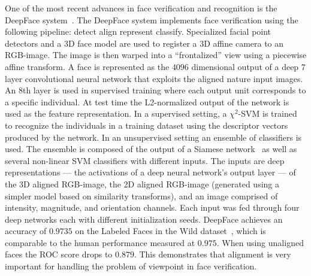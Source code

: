         One of the most recent advances in face verification and recognition is the DeepFace
        system~\cite{taigman_deepface_2014}. The DeepFace system implements face verification using the following
        pipeline: detect \rpipe{} align \rpipe{} represent \rpipe{} classify. Specialized facial point detectors
        and a 3D face model are used to register a 3D affine camera to an RGB-image. The image is then warped into
        a ``frontalized'' view using a piecewise affine transform. A face is represented as the $4096$ dimensional
        output of a deep $7$ layer convolutional neural network that exploits the aligned nature input images. An
        8th layer is used in supervised training where each output unit corresponds to a specific individual.
        At test time the L2-normalized output of the network is used as the feature representation. In a supervised
        setting, a $\chi^2$-SVM is trained to recognize the individuals in a training dataset using the descriptor
        vectors produced by the network. In an unsupervised setting an ensemble of classifiers is used. The
        ensemble is composed of the output of a Siamese network~\cite{chopra_learning_2005} as well as several
        non-linear SVM classifiers with different inputs. The inputs are deep representations --- the activations
        of a deep neural network's output layer --- of the 3D aligned RGB-image, the 2D aligned RGB-image
        (generated using a simpler model based on similarity transforms), and an image comprised of intensity,
        magnitude, and orientation channels. Each input was fed through four deep networks each with different
        initialization seeds.
        DeepFace achieves an accuracy of $0.9735$ on the Labeled Faces in the Wild
        dataset~\cite{huang_labeled_2007}, which is comparable to the human performance measured at $0.975$. When
        using unaligned faces the ROC score drops to $0.879$. This demonstrates that alignment is very important for
        handling the problem of viewpoint in face verification.


